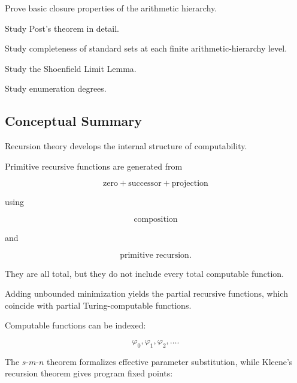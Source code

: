\begin{exercise}[4]
Prove basic closure properties of the arithmetic hierarchy.
\end{exercise}

\begin{exercise}[4]
Study Post's theorem in detail.
\end{exercise}

\begin{exercise}[4]
Study completeness of standard sets at each finite arithmetic-hierarchy
level.
\end{exercise}

\begin{exercise}[4]
Study the Shoenfield Limit Lemma.
\end{exercise}

\begin{exercise}[4]
Study enumeration degrees.
\end{exercise}

\subsection{Conceptual Summary}
\label{subsec:recursion-theory-summary}

Recursion theory develops the internal structure of computability.

Primitive recursive functions are generated from

\[
\boxed{
\text{zero}
+
\text{successor}
+
\text{projection}
}
\]

using

\[
\boxed{
\text{composition}
}
\]

and

\[
\boxed{
\text{primitive recursion}.
}
\]

They are all total, but they do not include every total computable function.

Adding unbounded minimization yields the partial recursive functions, which
coincide with partial Turing-computable functions.

Computable functions can be indexed:

\[
\boxed{
\varphi_0,
\varphi_1,
\varphi_2,\ldots.
}
\]

The \(s\)-\(m\)-\(n\) theorem formalizes effective parameter substitution,
while Kleene's recursion theorem gives program fixed points:

